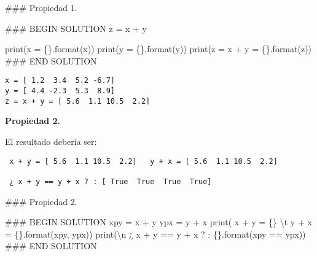 \documentclass[
  letterpaper,
  DIV=11,
  numbers=noendperiod]{scrreprt}
\newenvironment{Shaded}{\begin{snugshade}}{\end{snugshade}}
\newcommand{\BuiltInTok}[1]{\textcolor[rgb]{0.00,0.23,0.31}{#1}}
\newcommand{\CharTok}[1]{\textcolor[rgb]{0.13,0.47,0.30}{#1}}
\newcommand{\CommentTok}[1]{\textcolor[rgb]{0.37,0.37,0.37}{#1}}
\newcommand{\NormalTok}[1]{\textcolor[rgb]{0.00,0.23,0.31}{#1}}
\newcommand{\OperatorTok}[1]{\textcolor[rgb]{0.37,0.37,0.37}{#1}}
\newcommand{\RegionMarkerTok}[1]{\textcolor[rgb]{0.00,0.23,0.31}{#1}}
\newcommand{\SpecialCharTok}[1]{\textcolor[rgb]{0.37,0.37,0.37}{#1}}
\newcommand{\StringTok}[1]{\textcolor[rgb]{0.13,0.47,0.30}{#1}}
\begin{document}
\begin{Shaded}
\begin{Highlighting}[]
\CommentTok{\#\#\# Propiedad 1.}

\CommentTok{\#\#\# }\RegionMarkerTok{BEGIN}\CommentTok{ SOLUTION}
\NormalTok{z }\OperatorTok{=}\NormalTok{ x }\OperatorTok{+}\NormalTok{ y}

\BuiltInTok{print}\NormalTok{(}\StringTok{\textquotesingle{}x = }\SpecialCharTok{\{\}}\StringTok{\textquotesingle{}}\NormalTok{.}\BuiltInTok{format}\NormalTok{(x))}
\BuiltInTok{print}\NormalTok{(}\StringTok{\textquotesingle{}y = }\SpecialCharTok{\{\}}\StringTok{\textquotesingle{}}\NormalTok{.}\BuiltInTok{format}\NormalTok{(y))}
\BuiltInTok{print}\NormalTok{(}\StringTok{\textquotesingle{}z = x + y = }\SpecialCharTok{\{\}}\StringTok{\textquotesingle{}}\NormalTok{.}\BuiltInTok{format}\NormalTok{(z))}
\CommentTok{\#\#\# }\RegionMarkerTok{END}\CommentTok{ SOLUTION}
\end{Highlighting}
\end{Shaded}

\begin{verbatim}
x = [ 1.2  3.4  5.2 -6.7]
y = [ 4.4 -2.3  5.3  8.9]
z = x + y = [ 5.6  1.1 10.5  2.2]
\end{verbatim}

\textbf{Propiedad 2.}

El resultado debería ser:

\begin{verbatim}
 x + y = [ 5.6  1.1 10.5  2.2]   y + x = [ 5.6  1.1 10.5  2.2]

 ¿ x + y == y + x ? : [ True  True  True  True]
\end{verbatim}

\begin{Shaded}
\begin{Highlighting}[]
\CommentTok{\#\#\# Propiedad 2.}

\CommentTok{\#\#\# }\RegionMarkerTok{BEGIN}\CommentTok{ SOLUTION}
\NormalTok{xpy }\OperatorTok{=}\NormalTok{ x }\OperatorTok{+}\NormalTok{ y}
\NormalTok{ypx }\OperatorTok{=}\NormalTok{ y }\OperatorTok{+}\NormalTok{ x}
\BuiltInTok{print}\NormalTok{(}\StringTok{\textquotesingle{} x + y = }\SpecialCharTok{\{\}}\StringTok{ }\CharTok{\textbackslash{}t}\StringTok{ y + x = }\SpecialCharTok{\{\}}\StringTok{\textquotesingle{}}\NormalTok{.}\BuiltInTok{format}\NormalTok{(xpy, ypx))}
\BuiltInTok{print}\NormalTok{(}\StringTok{\textquotesingle{}}\CharTok{\textbackslash{}n}\StringTok{ ¿ x + y == y + x ? : }\SpecialCharTok{\{\}}\StringTok{\textquotesingle{}}\NormalTok{.}\BuiltInTok{format}\NormalTok{(xpy }\OperatorTok{==}\NormalTok{ ypx))}
\CommentTok{\#\#\# }\RegionMarkerTok{END}\CommentTok{ SOLUTION}
\end{Highlighting}
\end{Shaded}
\end{document}
